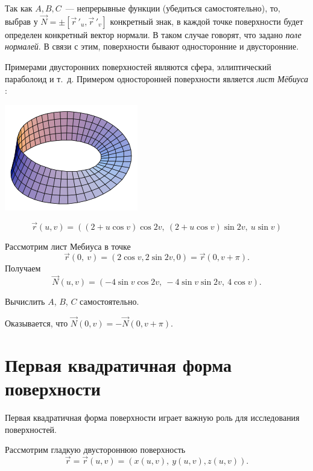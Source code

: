 \documentclass[../../main.tex]{subfiles}
\begin{document}
Так как $A, B, C$~--- непрерывные функции (убедиться самостоятельно), то, 
выбрав у $\vec{N} = \pm\left[ \vec r\,'_u, \vec r\,'_v \right]$ конкретный 
знак, в каждой точке поверхности будет определен конкретный вектор нормали. В 
таком случае говорят, что задано \emph{поле нормалей}. В связи с этим, 
поверхности бывают односторонние и двусторонние.

Примерами двусторонних поверхностей являются сфера, эллиптический параболоид и 
т.~д. Примером односторонней поверхности является \emph{лист Мёбиуса} :

\begin{center}
\includegraphics[scale = 0.5]{lec22_0.png}
\end{center}

\[\vec{r}(u, v) = ((2 + u\cos v)\cos2v, \ (2 + u\cos v)\sin2v, \ u\sin v)\]

Рассмотрим лист Мебиуса в точке
\[\vec{r}(0, \ v) = (2\cos v, 2\sin2v, 0) = \vec{r}(0, v + \pi).\]
Получаем
\[\vec{N}(u, v) = (-4\sin v\cos2v, \ -4\sin v\sin2v, \ 4\cos v).\] 

\begin{exc}
 Вычислить $A$, $B$, $C$ самостоятельно.
\end{exc}

\bigskip

Оказывается, что
$\vec{N}(0, v) = -\vec{N}(0, v + \pi).$

\section{Первая квадратичная форма поверхности}

Первая квадратичная форма поверхности играет важную роль для исследования 
поверхностей.

Рассмотрим гладкую двустороннюю поверхность \[\vec{r} = \vec{r}(u,  v) = 
(x(u,  v), \ y(u,  v), z(u,  v)).\]
\end{document}
